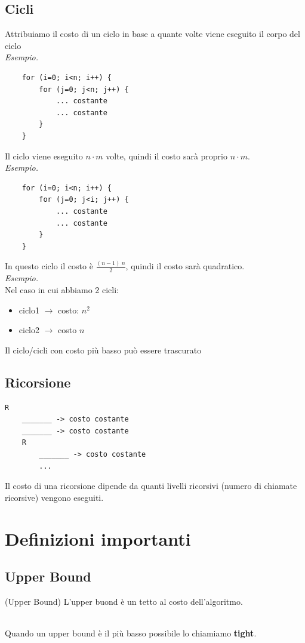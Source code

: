 \subsection{Cicli}
Attribuiamo il costo di un ciclo in base a quante volte viene eseguito il corpo del ciclo\smallskip\\
\textit{Esempio.}
\begin{verbatim}
    for (i=0; i<n; i++) {
        for (j=0; j<n; j++) {
            ... costante
            ... costante
        }
    }
\end{verbatim}
Il ciclo viene eseguito $n\cdot m$ volte, quindi il costo sarà proprio $n\cdot m$.\smallskip\\
\textit{Esempio.}
\begin{verbatim}
    for (i=0; i<n; i++) {
        for (j=0; j<i; j++) {
            ... costante
            ... costante
        }
    }
\end{verbatim}
In questo ciclo il costo è $\displaystyle \frac{(n-1)\ n}{2}$, quindi il costo sarà quadratico.\smallskip\\
\textit{Esempio.}\\
\noindent Nel caso in cui abbiamo 2 cicli:
\begin{itemize}
    \item ciclo1 $\to $ costo: $n^2$
    \item ciclo2 $\to $ costo $n$
\end{itemize}
Il ciclo/cicli con costo più basso può essere trascurato



\subsection{Ricorsione}
\begin{verbatim}
R
    _______ -> costo costante
    _______ -> costo costante
    R
        _______ -> costo costante
        ...
\end{verbatim}
Il costo di una ricorsione dipende da quanti livelli ricorsivi (numero di chiamate ricorsive) vengono eseguiti.



\section{Definizioni importanti}

\subsection{Upper Bound}
\colorbox{SALZO}{\parbox{\dimexpr\linewidth-2\fboxsep}{\begin{definition}
   (Upper Bound) L'upper buond è un tetto al costo dell'algoritmo.
\end{definition}}}\smallskip\\
Quando un upper bound è il più basso possibile lo chiamiamo \textbf{tight}.



